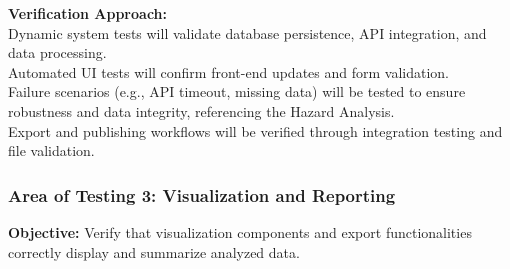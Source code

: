\documentclass[12pt, titlepage]{article}
\begin{document}
\noindent\textbf{Verification Approach:}\\
Dynamic system tests will validate database persistence, API integration, and data processing.\\
Automated UI tests will confirm front-end updates and form validation.\\
Failure scenarios (e.g., API timeout, missing data) will be tested to ensure robustness and data integrity, referencing the Hazard Analysis.\\
Export and publishing workflows will be verified through integration testing and file validation.\\[0.5em]


\subsubsection{Area of Testing 3: Visualization and Reporting}
\textbf{Objective:} Verify that visualization components and export functionalities correctly display and summarize analyzed data.
\end{document}
